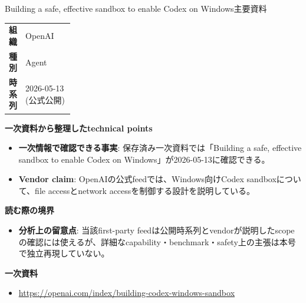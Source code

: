\begin{technicalnote}{Building a safe, effective sandbox to enable Codex on Windows}{主要資料}
\begingroup
\begin{tabularx}{\linewidth}{@{}>{\bfseries}p{0.22\linewidth}X@{}}
組織 & OpenAI \\
種別 & Agent \\
時系列 & 2026-05-13 (公式公開) \\
\end{tabularx}
\smallskip
{\bfseries 一次資料から整理したtechnical points}
\begin{itemize}[leftmargin=1.5em,itemsep=0.35em]
\item \textbf{一次情報で確認できる事実}: 保存済み一次資料では「Building a safe, effective sandbox to enable Codex on Windows」が2026-05-13に確認できる。
\item \textbf{Vendor claim}: OpenAIの公式feedでは、Windows向けCodex sandboxについて、file accessとnetwork accessを制御する設計を説明している。
\end{itemize}
{\bfseries 読む際の境界}
\begin{itemize}[leftmargin=1.5em,itemsep=0.35em]
\item \textbf{分析上の留意点}: 当該first-party feedは公開時系列とvendorが説明したscopeの確認には使えるが、詳細なcapability・benchmark・safety上の主張は本号で独立再現していない。
\end{itemize}
\begin{samepage}
{\bfseries 一次資料}
\begingroup\sloppy
\begin{itemize}[leftmargin=1.5em,itemsep=0.25em]
\item {\scriptsize\url{https://openai.com/index/building-codex-windows-sandbox}}
\end{itemize}
\endgroup
\end{samepage}
\endgroup
\end{technicalnote}
\medskip

